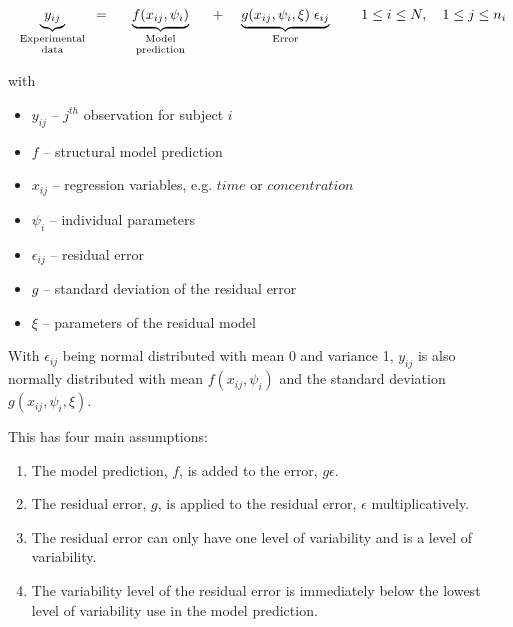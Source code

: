 \documentclass[a4paper,11pt]{article}
\begin{document}
\begin{equation}
 \underbrace{ y_{ij}}_{\text{\parbox{2cm}{\centering Experimental \\[-4pt]  data}}} =
 \underbrace{ f(x_{ij}, \psi_{i})}_{\text{\parbox{2.5cm}{\centering Model \\[-4pt]  prediction}}} + 
 \underbrace{ g(x_{ij}, \psi_{i}, \xi) \; \epsilon_{ij}}_{\text{\parbox{3cm}{\centering Error}}} 
\quad 1\le i \le N, \quad 1\le j \le n_i 
 \end{equation}

 with
\begin{itemize}
\item
$y_{ij}$ -- $j^{th}$ observation for subject $i$
\item
$f$ -- structural model prediction
\item
$x_{ij}$ -- regression variables, e.g. $time$ or $concentration$
\item
$\psi_{i}$ -- individual parameters
\item
$\epsilon_{ij}$ -- residual error
\item
$g$ -- standard deviation of the residual error
\item 
$\xi$ -- parameters of the residual model
\end{itemize}
With $\epsilon_{ij}$ being normal distributed with mean 0 and variance
1, $y_{ij}$ is also normally distributed with mean $ f(x_{ij},
\psi_{i})$ and the standard deviation $g(x_{ij}, \psi_{i}, \xi)$.

This has four main assumptions:

\begin{enumerate}
\item The model prediction, $f$, is added to the error, $g\epsilon$.
\item The residual error, $g$, is applied to the residual error, $\epsilon$ multiplicatively.
\item The residual error can only have one level of variability and is a level of variability.
\item The variability level of the residual error is immediately below the lowest level of variability use in the model prediction.
\end{enumerate}
\end{document}

